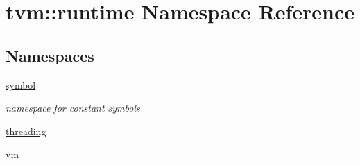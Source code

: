 \hypertarget{namespacetvm_1_1runtime}{}\section{tvm\+:\+:runtime Namespace Reference}
\label{namespacetvm_1_1runtime}
\subsection*{Namespaces}
\begin{DoxyCompactItemize}
\item 
 \hyperlink{namespacetvm_1_1runtime_1_1symbol}{symbol}
\begin{DoxyCompactList}\small\item\em namespace for constant symbols \end{DoxyCompactList}\item 
 \hyperlink{namespacetvm_1_1runtime_1_1threading}{threading}
\item 
 \hyperlink{namespacetvm_1_1runtime_1_1vm}{vm}
\end{DoxyCompactItemize}
